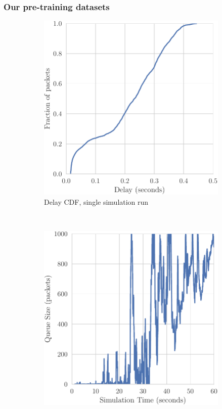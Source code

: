 \documentclass{beamer}
\begin{document}
\begin{frame}
\frametitle{Our pre-training datasets}


\begin{figure}[h]
     
    \captionsetup[subfigure]{justification=centering}
    \begin{subfigure}[h]{0.5\textwidth}
    	\begin{center}
        \centering
        \includegraphics[scale=0.5]{figures/delay.pdf}
        \caption{Delay CDF, single simulation run}
        \end{center}
    \end{subfigure}%
    ~ 
    \begin{subfigure}[h]{0.5\textwidth}
    	\begin{center}
        \centering
        \includegraphics[scale=0.5]{figures/queue_profile_A.pdf}

\end{center}
\end{subfigure}
\end{figure}
\end{frame}
\end{document}
